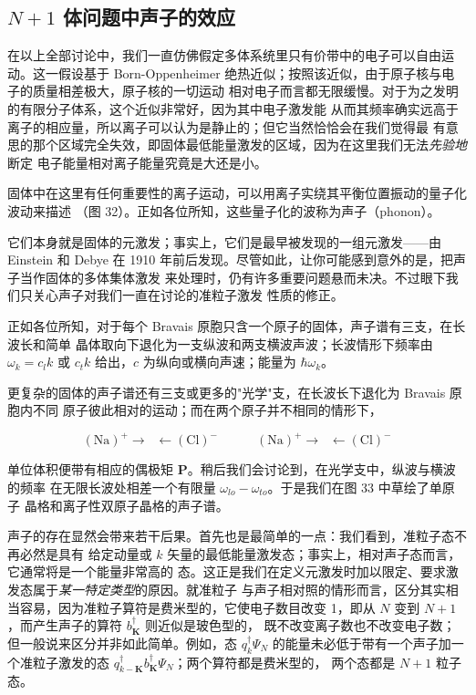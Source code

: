 
\subsection{$N+1$ 体问题中声子的效应}

在以上全部讨论中，我们一直仿佛假定多体系统里只有价带中的电子可以自由运动。这一假设基于
Born-Oppenheimer 绝热近似；按照该近似，由于原子核与电子的质量相差极大，原子核的一切运动
相对电子而言都无限缓慢。对于为之发明的有限分子体系，这个近似非常好，因为其中电子激发能
从而其频率确实远高于离子的相应量，所以离子可以认为是静止的；但它当然恰恰会在我们觉得最
有意思的那个区域完全失效，即固体最低能量激发的区域，因为在这里我们无法\emph{先验地}断定
电子能量相对离子能量究竟是大还是小。

固体中在这里有任何重要性的离子运动，可以用离子实绕其平衡位置振动的量子化波动来描述
（图 32）。正如各位所知，这些量子化的波称为声子（phonon）。


它们本身就是固体的元激发；事实上，它们是最早被发现的一组元激发——由 Einstein 和
Debye 在 1910 年前后发现。尽管如此，让你可能感到意外的是，把声子当作固体的多体集体激发
来处理时，仍有许多重要问题悬而未决。不过眼下我们只关心声子对我们一直在讨论的准粒子激发
性质的修正。

正如各位所知，对于每个 Bravais 原胞只含一个原子的固体，声子谱有三支，在长波长和简单
晶体取向下退化为一支纵波和两支横波声波；长波情形下频率由 $\omega_{k}=c_{l}k$ 或
$c_{t}k$ 给出，$c$ 为纵向或横向声速；能量为 $\hbar\omega_{k}$。

更复杂的固体的声子谱还有三支或更多的"光学"支，在长波长下退化为 Bravais 原胞内不同
原子彼此相对的运动；而在两个原子并不相同的情形下，

\begin{equation*}
(\text{Na})^{+}\!\to\;\; \leftarrow\!\!(\text{Cl})^{-}
\qquad\quad
(\text{Na})^{+}\!\to\;\; \leftarrow\!\!(\text{Cl})^{-}
\end{equation*}

单位体积便带有相应的偶极矩 $\mathbf{P}$。稍后我们会讨论到，在光学支中，纵波与横波的频率
在无限长波处相差一个有限量 $\omega_{lo}-\omega_{to}$。于是我们在图 33 中草绘了单原子
晶格和离子性双原子晶格的声子谱。


声子的存在显然会带来若干后果。首先也是最简单的一点：我们看到，准粒子态不再必然是具有
给定动量或 $k$ 矢量的最低能量激发态；事实上，相对声子态而言，它通常将是一个能量非常高的
态。这正是我们在定义元激发时加以限定、要求激发态属于\emph{某一特定类型}的原因。就准粒子
与声子相对照的情形而言，区分其实相当容易，因为准粒子算符是费米型的，它使电子数目改变
1，即从 $N$ 变到 $N+1$，而产生声子的算符 $b_{\mathbf{K}}^{\dagger}$ 则近似是玻色型的，
既不改变离子数也不改变电子数；但一般说来区分并非如此简单。例如，态 $q_{k}^{\dagger}\Psi_{N}$
的能量未必低于带有一个声子加一个准粒子激发的态
$q_{k-\mathbf{K}}^{\dagger}b_{\mathbf{K}}^{\dagger}\Psi_{N}$；两个算符都是费米型的，
两个态都是 $N+1$ 粒子态。

